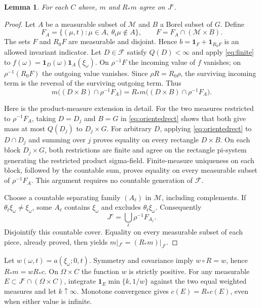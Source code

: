 \documentclass[11pt]{article}
\newtheorem{lemma}{Lemma}
\newcommand{\MM}{\mathcal M}
\newcommand{\FF}{\mathcal F}
\newcommand{\ind}{\mathbf 1}
\begin{document}
\begin{lemma}\label{lem:oriented}
For each $C$ above, $m$ and $R_*m$ agree on $J^c$.
\end{lemma}
\begin{proof}
Let $A$ be a measurable subset of $\MM$ and $B$ a Borel subset of $G$. Define
\[
 F_A=\{(\mu,t):\mu\in A,\ \theta_t\mu\notin A\},
 \qquad F=F_A\cap(\MM\times B).
\]
The sets $F$ and $R_0F$ are measurable and disjoint. Hence
$b=\ind_F+\ind_{R_0F}$ is an allowed invariant indicator. Let $D\in\FF$ satisfy $Q(D)<\infty$ and apply \eqref{eq:finite} to
$f(\omega)=\ind_D(\omega)\ind_A(\xi_\omega)$.
On $\rho^{-1}F$ the incoming value of $f$ vanishes; on $\rho^{-1}(R_0F)$ the outgoing value vanishes. Since $\rho R=R_0\rho$, the surviving incoming term is the reversal of the surviving outgoing term. Thus
\begin{equation}
 m\bigl((D\times B)\cap\rho^{-1}F_A\bigr)
 =R_*m\bigl((D\times B)\cap\rho^{-1}F_A\bigr). \label{eq:orientedrect}
\end{equation}

Here is the product-measure extension in detail. For the two measures restricted to $\rho^{-1}F_A$, taking $D=D_j$ and $B=G$ in \eqref{eq:orientedrect} shows that both give mass at most $Q(D_j)$ to $D_j\times G$. For arbitrary $D$, applying \eqref{eq:orientedrect} to $D\cap D_j$ and summing over $j$ proves equality on every rectangle $D\times B$. On each block $D_j\times G$, both restrictions are finite and agree on the rectangle pi-system generating the restricted product sigma-field. Finite-measure uniqueness on each block, followed by the countable sum, proves equality on every measurable subset of $\rho^{-1}F_A$. This argument requires no countable generation of $\FF$.

Choose a countable separating family $(A_\ell)$ in $\MM$, including complements. If $\theta_t\xi_\omega\ne\xi_\omega$, some $A_\ell$ contains $\xi_\omega$ and excludes $\theta_t\xi_\omega$. Consequently
\[
 J^c=\bigcup_\ell\rho^{-1}F_{A_\ell}.
\]
Disjointify this countable cover. Equality on every measurable subset of each piece, already proved, then yields $m|_{J^c}=(R_*m)|_{J^c}$.
\end{proof}

Let $w(\omega,t)=a(\xi_\omega;0,t)$. Symmetry and covariance imply $w\circ R=w$, hence $R_*m=wR_*c$. On $\Omega\times C$ the function $w$ is strictly positive. For any measurable $E\subset J^c\cap(\Omega\times C)$, integrate
$\ind_E\min\{k,1/w\}$ against the two equal weighted measures and let $k\uparrow\infty$. Monotone convergence gives $c(E)=R_*c(E)$, even when either value is infinite.
\end{document}
